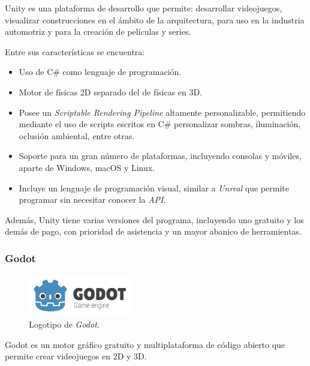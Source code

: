 Unity \cite{unity} es una plataforma de desarrollo que permite: desarrollar videojuegos, visualizar construcciones en el ámbito de la arquitectura, para uso en la industria automotriz y para la creación de películas y series.

\bigskip

Entre sus características se encuentra:

\begin{itemize}
   \item Uso de C\# como lenguaje de programación.
   \item Motor de físicas 2D separado del de físicas en 3D.
   \item Posee un \textit{Scriptable Rendering Pipeline} altamente personalizable, permitiendo mediante el uso de scripts escritos en C\# personalizar sombras, iluminación, oclusión ambiental, entre otras.
   \item Soporte para un gran número de plataformas, incluyendo consolas y móviles, aparte de Windows, macOS y Linux.
   \item Incluye un lenguaje de programación visual, similar a \textit{Unreal} que permite programar sin necesitar conocer la \textit{API}.
\end{itemize}
   
Además, Unity tiene varias versiones del programa, incluyendo uno gratuito y los demás de pago, con prioridad de asistencia y un mayor abanico de herramientas.

\subsubsection{Godot}

\begin{figure}[H]
   \centering
   \includegraphics[width=0.4\textwidth]{imagenes/GODOT_LOGO.png}
   \caption{Logotipo de \textit{Godot}\cite{godot-logo}.}
\end{figure}

Godot \cite{godot} es un motor gráfico gratuito y multiplataforma de código abierto que permite crear videojuegos en 2D y 3D. 

